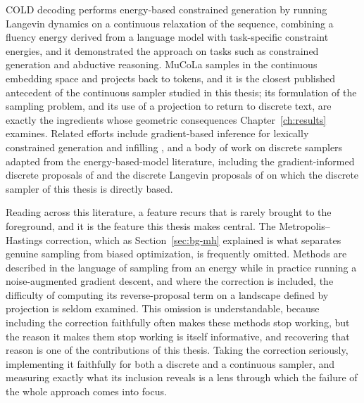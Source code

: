 COLD decoding \citep{qin2022cold} performs energy-based constrained generation by running Langevin dynamics on a continuous relaxation of the sequence, combining a fluency energy derived from a language model with task-specific constraint energies, and it demonstrated the approach on tasks such as constrained generation and abductive reasoning. MuCoLa \citep{kumar2022gradient} samples in the continuous embedding space and projects back to tokens, and it is the closest published antecedent of the continuous sampler studied in this thesis; its formulation of the sampling problem, and its use of a projection to return to discrete text, are exactly the ingredients whose geometric consequences Chapter~\ref{ch:results} examines. Related efforts include gradient-based inference for lexically constrained generation and infilling \citep{sha2020gradient}, and a body of work on discrete samplers adapted from the energy-based-model literature, including the gradient-informed discrete proposals of \citet{grathwohl2021oops} and the discrete Langevin proposals of \citet{zhang2022langevin} on which the discrete sampler of this thesis is directly based.

Reading across this literature, a feature recurs that is rarely brought to the foreground, and it is the feature this thesis makes central. The Metropolis--Hastings correction, which as Section~\ref{sec:bg-mh} explained is what separates genuine sampling from biased optimization, is frequently omitted. Methods are described in the language of sampling from an energy while in practice running a noise-augmented gradient descent, and where the correction is included, the difficulty of computing its reverse-proposal term on a landscape defined by projection is seldom examined. This omission is understandable, because including the correction faithfully often makes these methods stop working, but the reason it makes them stop working is itself informative, and recovering that reason is one of the contributions of this thesis. Taking the correction seriously, implementing it faithfully for both a discrete and a continuous sampler, and measuring exactly what its inclusion reveals is a lens through which the failure of the whole approach comes into focus.

